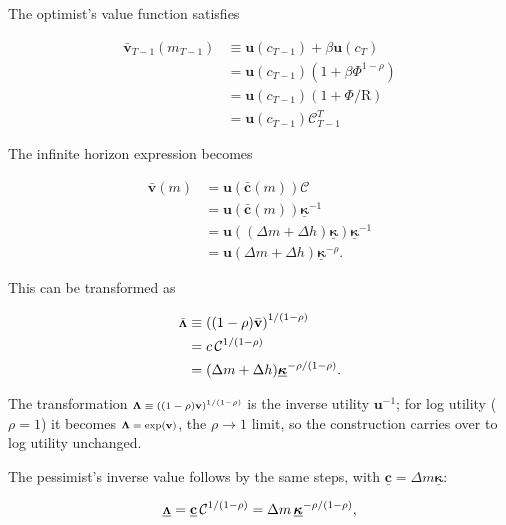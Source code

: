 \documentclass[preprint,authoryear]{elsarticle}
\newcommand{\DiscFac}{\beta}
\newcommand{\CRRA}{\rho}
\newcommand{\AbsPatFac}{\Phi}
\newcommand{\Rfree}{\text{R}}
\newcommand{\hNrm}{h}
\newcommand{\MPC}{\boldsymbol{\kappa}}
\newcommand{\MPCmin}{\underline{\MPC}}
\newcommand{\mNrm}{m}
\newcommand{\mNrmEx}{\Delta \mNrm}
\newcommand{\cFunc}{\mathbf{c}}
\newcommand{\hNrmEx}{\Delta \hNrm}
\newcommand{\PDVCoverc}{\mathcal{C}}
\newcommand{\cNrm}{c}
\newcommand{\uFunc}{\mathbf{u}}
\newcommand{\vFunc}{\mathbf{v}}
\newcommand{\vFuncOpt}{\bar{\vFunc}}
\newcommand{\cFuncOpt}{\bar{\cFunc}}
\newcommand{\vInv}{{\scriptsize \boldsymbol{\Lambda}}}
\newcommand{\vInvOpt}{\bar{\vInv}}
\newcommand{\cFuncPes}{\underline{\cFunc}}
\newcommand{\vInvPes}{\underline{\vInv}}
\begin{document}
The optimist's value function satisfies

\begin{equation}
\begin{aligned}
\vFuncOpt_{T-1}(\mNrm_{T-1}) &\equiv  \uFunc(\cNrm_{T-1})+\DiscFac \uFunc(\cNrm_{T}) \\
&= \uFunc(\cNrm_{T-1})\left(1+\DiscFac \AbsPatFac^{1-\CRRA}\right) \\
&= \uFunc(\cNrm_{T-1})\left(1+\AbsPatFac/\Rfree\right) \\
&= \uFunc(\cNrm_{T-1})\PDVCoverc_{T-1}^{T}
\end{aligned}
\end{equation}

The infinite horizon expression becomes

\begin{equation}
\label{eq:vFuncPF}
\begin{aligned}
\vFuncOpt(\mNrm) &= \uFunc(\cFuncOpt(\mNrm))\PDVCoverc \\
&= \uFunc(\cFuncOpt(\mNrm))\MPCmin^{-1} \\
&= \uFunc((\mNrmEx+\hNrmEx)\MPCmin) \MPCmin^{-1} \\
&= \uFunc(\mNrmEx+\hNrmEx)\MPCmin^{-\CRRA}.
\end{aligned}
\end{equation}

This can be transformed as

\begin{equation}
\begin{aligned}
\vInvOpt &\equiv  \left((1-\CRRA)\vFuncOpt\right)^{1/(1-\CRRA)}   \\
&= \cNrm\,\PDVCoverc^{1/(1-\CRRA)} \\
&= (\mNrmEx+\hNrmEx)\MPCmin^{-\CRRA/(1-\CRRA)}.
\end{aligned}
\end{equation}

The transformation $\vInv \equiv \left((1 -\CRRA)\vFunc\right)^{1/(1 -\CRRA)}$ is the inverse utility $\uFunc^{ -1}$; for log utility ($\CRRA=1$) it becomes $\vInv = \exp(\vFunc)$, the $\CRRA\to1$ limit, so the construction carries over to log utility unchanged.

The pessimist's inverse value follows by the same steps, with $\cFuncPes = \mNrmEx\MPCmin$:

\begin{equation}
\vInvPes = \cFuncPes\,\PDVCoverc^{1/(1-\CRRA)} = \mNrmEx\,\MPCmin^{-\CRRA/(1-\CRRA)},
\end{equation}
\end{document}
